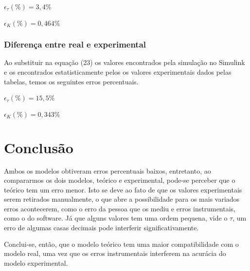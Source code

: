 \documentclass[12pt]{article}
\begin{document}
\begin{center}
      $\epsilon_{\tau}(\%)  = 3,4 \%$
\end{center}

\begin{center}
      $\epsilon_{K}(\%) = 0,464\%$
\end{center}

\subsubsection{Diferença entre real e experimental}

\quad Ao substituir na equação (23) os valores encontrados pela simulação no Simulink e os encontrados estatisticamente pelos os valores experimentais dados pelas tabelas, temos os seguintes erros percentuais.

\begin{center}
     $\epsilon_{\tau}(\%) = 15,5 \%$
\end{center}

\begin{center}
     $\epsilon_{K}(\%)= 0,343\%$
\end{center}
\section{Conclusão}

\quad Ambos os modelos obtiveram erros percentuais baixos, entretanto, ao compararmos os dois modelos, teórico e experimental, pode-se perceber que o teórico tem um erro menor. Isto se deve ao fato de que os valores experimentais serem retirados manualmente, o que abre a possibilidade para os mais variados erros acontecerem, como o erro da pessoa que os mediu e erros instrumentais, como o do software. Já que alguns valores tem uma ordem pequena, vide o $\tau$, um erro de algumas casas decimais pode interferir significativamente.
\par Conclui-se, então, que o modelo teórico tem uma maior compatibilidade com o modelo real, uma vez que os erros instrumentais interferem na acurácia do modelo experimental.
\end{document}
